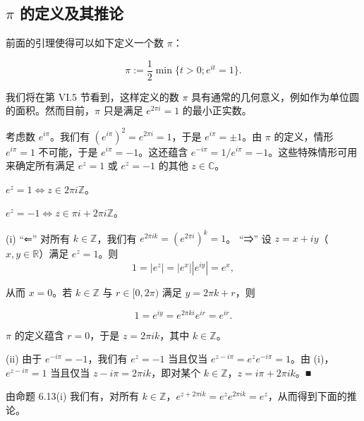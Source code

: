 \subsection*{$ \pi $ 的定义及其推论}

前面的引理使得可以如下定义一个数 $ \pi $：

\[
\pi:=\frac{1}{2}\min\{t>0;e^{it}=1\}.
\]

我们将在第 VI.5 节看到，这样定义的数 $\pi$ 具有通常的几何意义，例如作为单位圆的面积。然而目前，$\pi$ 只是满足 $e^{2\pi i}=1$ 的最小正实数。

考虑数 $ e^{i\pi} $。我们有 $ (e^{i\pi})^2 = e^{2\pi i} = 1 $，于是 $ e^{i\pi} = \pm1 $。由 $ \pi $ 的定义，情形 $ e^{i\pi} = 1 $ 不可能，于是 $ e^{i\pi} = -1 $。这还蕴含 $ e^{-i\pi} = 1/e^{i\pi} = -1 $。这些特殊情形可用来确定所有满足 $ e^z = 1 $ 或 $ e^z = -1 $ 的其他 $ z \in \mathbb{C} $。

\begin{proposition}

\begin{subitems}
\item

$ e^z = 1 \iff z \in 2\pi i \mathbb{Z} $。

\item

$ e^z = -1 \Leftrightarrow z \in \pi i + 2\pi i\mathbb{Z} $。

\proofhead
(i) “⇐” 对所有 $ k \in \mathbb{Z} $，我们有 $ e^{2\pi ik} = (e^{2\pi i})^k = 1 $。
“⇒” 设 $ z = x + iy $（$ x, y \in \mathbb{R} $）满足 $ e^z = 1 $。则
\[
1=\left|e^{z}\right|=\left|e^{x}\right|\left|e^{iy}\right|=e^{x},
\]

从而 $ x = 0 $。若 $ k \in \mathbb{Z} $ 与 $ r \in [0, 2\pi) $ 满足 $ y = 2\pi k + r $，则

\[
1=e^{i y}=e^{2\pi k i}e^{i r}=e^{i r}.
\]

$ \pi $ 的定义蕴含 $ r = 0 $，于是 $ z = 2\pi i k $，其中 $ k \in \mathbb{Z} $。

\end{subitems}

(ii) 由于 $ e^{-i\pi} = -1 $，我们有 $ e^z = -1 $ 当且仅当 $ e^{z-i\pi} = e^z e^{-i\pi} = 1 $。由 (i)，$ e^{z-i\pi} = 1 $ 当且仅当 $ z - i\pi = 2\pi ik $，即对某个 $ k \in \mathbb{Z} $，$ z = i\pi + 2\pi ik $。■

\end{proposition}

由命题 6.13(i) 我们有，对所有 $ k \in \mathbb{Z} $，$ e^{z+2\pi ik} = e^z e^{2\pi ik} = e^z $，从而得到下面的推论。

